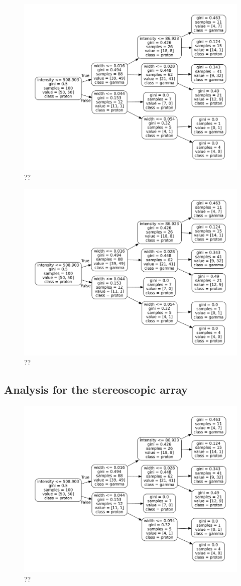 \begin{figure}
    \includegraphics[width=.8\textwidth]{Plots/decision_tree.pdf}
    \caption{??}
    \label{fig:??}
\end{figure}

\begin{figure}
    \includegraphics[width=.8\textwidth]{Plots/decision_tree.pdf}
    \caption{??}
    \label{fig:??}
\end{figure}



\subsection{Analysis for the stereoscopic array}
\begin{figure}
    \includegraphics[width=.8\textwidth]{Plots/decision_tree.pdf}
    \caption{??}
    \label{fig:??}
\end{figure}

